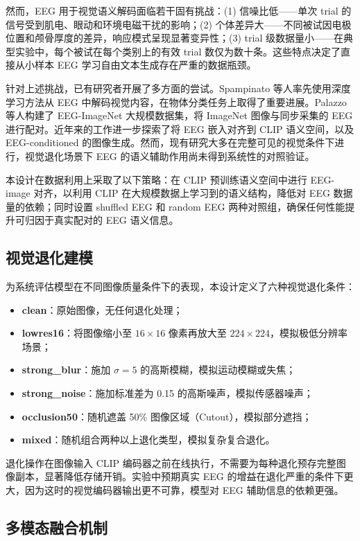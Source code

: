 然而，EEG 用于视觉语义解码面临若干固有挑战：(1) 信噪比低——单次 trial 的信号受到肌电、眼动和环境电磁干扰的影响；(2) 个体差异大——不同被试因电极位置和颅骨厚度的差异，响应模式呈现显著变异性；(3) trial 级数据量小——在典型实验中，每个被试在每个类别上的有效 trial 数仅为数十条。这些特点决定了直接从小样本 EEG 学习自由文本生成存在严重的数据瓶颈。

针对上述挑战，已有研究者开展了多方面的尝试。Spampinato 等人率先使用深度学习方法从 EEG 中解码视觉内容，在物体分类任务上取得了重要进展。Palazzo 等人构建了 EEG-ImageNet 大规模数据集，将 ImageNet 图像与同步采集的 EEG 进行配对。近年来的工作进一步探索了将 EEG 嵌入对齐到 CLIP 语义空间，以及 EEG-conditioned 的图像生成。然而，现有研究大多在完整可见的视觉条件下进行，视觉退化场景下 EEG 的语义辅助作用尚未得到系统性的对照验证。

本设计在数据利用上采取了以下策略：在 CLIP 预训练语义空间中进行 EEG-image 对齐，以利用 CLIP 在大规模数据上学习到的语义结构，降低对 EEG 数据量的依赖；同时设置 shuffled EEG 和 random EEG 两种对照组，确保任何性能提升可归因于真实配对的 EEG 语义信息。

\subsection{视觉退化建模}

为系统评估模型在不同图像质量条件下的表现，本设计定义了六种视觉退化条件：

\begin{itemize}
  \item \textbf{clean}：原始图像，无任何退化处理；
  \item \textbf{lowres16}：将图像缩小至 $16\times16$ 像素再放大至 $224\times224$，模拟极低分辨率场景；
  \item \textbf{strong\_blur}：施加 $\sigma=5$ 的高斯模糊，模拟运动模糊或失焦；
  \item \textbf{strong\_noise}：施加标准差为 0.15 的高斯噪声，模拟传感器噪声；
  \item \textbf{occlusion50}：随机遮盖 50\% 图像区域（Cutout），模拟部分遮挡；
  \item \textbf{mixed}：随机组合两种以上退化类型，模拟复杂复合退化。
\end{itemize}

退化操作在图像输入 CLIP 编码器之前在线执行，不需要为每种退化预存完整图像副本，显著降低存储开销。实验中预期真实 EEG 的增益在退化严重的条件下更大，因为这时的视觉编码器输出更不可靠，模型对 EEG 辅助信息的依赖更强。

\subsection{多模态融合机制}

